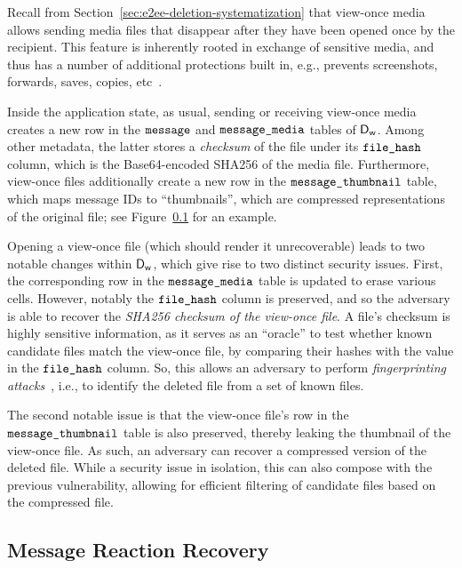 Recall from Section~\ref{sec:e2ee-deletion-systematization} that view-once media allows sending media files that disappear after they have been opened once by the recipient. 
This feature is inherently rooted in exchange of sensitive media, and thus has a number of additional protections built in, e.g., prevents screenshots, forwards, saves, copies, etc~\cite{whatsapp-view-once-media}. 

Inside the application state, as usual, sending or receiving view-once media creates a new row in the $\texttt{message}$ and $\texttt{message\_media}$ tables of $\textsf{D}_{\textsf{w}}$. Among other metadata, the latter stores a \emph{checksum} of the file under its $\texttt{file\_hash}$ column, which is the Base64-encoded SHA256 of the media file. Furthermore, view-once files additionally create a new row in the $\texttt{message\_thumbnail}$ table, which maps message IDs to ``thumbnails'', which are compressed representations of the original file; 
see Figure~\ref{} for an example.

Opening a view-once file (which should render it unrecoverable) leads to two notable changes within $\textsf{D}_{\textsf{w}}$, which give rise to two distinct security issues. First, the corresponding row in the $\texttt{message\_media}$ table is updated to erase various cells. However, notably the $\texttt{file\_hash}$ column is preserved, and so the adversary is able to recover the \emph{SHA256 checksum of the view-once file}. A file's checksum is highly sensitive information, as it serves as an ``oracle'' to test whether known candidate files match the view-once file, by comparing their hashes with the value in the $\texttt{file\_hash}$ column. So, this allows an adversary to perform \emph{fingerprinting attacks}~\cite{ritzdorf2016information}, i.e., to identify the deleted file from a set of known files.

The second notable issue is that the view-once file's row in the $\texttt{message\_thumbnail}$ table is also preserved, thereby leaking the thumbnail of the view-once file. As such, an adversary can recover a compressed version of the deleted file. While a security issue in isolation, this can also compose with the previous vulnerability, allowing for efficient filtering of candidate files based on the compressed file.

\subsection{Message Reaction Recovery}


